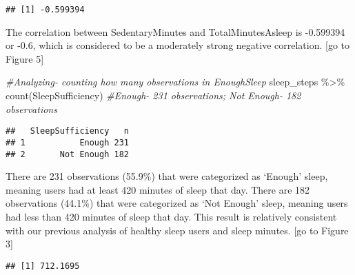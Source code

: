 \documentclass[
]{article}
\newenvironment{Shaded}{\begin{snugshade}}{\end{snugshade}}
\newcommand{\CommentTok}[1]{\textcolor[rgb]{0.56,0.35,0.01}{\textit{#1}}}
\newcommand{\FunctionTok}[1]{\textcolor[rgb]{0.00,0.00,0.00}{#1}}
\newcommand{\NormalTok}[1]{#1}
\newcommand{\SpecialCharTok}[1]{\textcolor[rgb]{0.00,0.00,0.00}{#1}}
\begin{document}
\begin{Shaded}
\end{Shaded}

\begin{verbatim}
## [1] -0.599394
\end{verbatim}

The correlation between SedentaryMinutes and TotalMinutesAsleep is
-0.599394 or -0.6, which is considered to be a moderately strong
negative correlation. {[}go to Figure 5{]}

\begin{Shaded}
\begin{Highlighting}[]
\CommentTok{\#Analyzing{-} counting how many observations in EnoughSleep}
\NormalTok{sleep\_steps }\SpecialCharTok{\%\textgreater{}\%} \FunctionTok{count}\NormalTok{(SleepSufficiency) }\CommentTok{\#Enough{-} 231 observations; Not Enough{-} 182 observations}
\end{Highlighting}
\end{Shaded}

\begin{verbatim}
##   SleepSufficiency   n
## 1           Enough 231
## 2       Not Enough 182
\end{verbatim}

There are 231 observations (55.9\%) that were categorized as `Enough'
sleep, meaning users had at least 420 minutes of sleep that day. There
are 182 observations (44.1\%) that were categorized as `Not Enough'
sleep, meaning users had less than 420 minutes of sleep that day. This
result is relatively consistent with our previous analysis of healthy
sleep users and sleep minutes. {[}go to Figure 3{]}

\begin{Shaded}
\end{Shaded}

\begin{verbatim}
## [1] 712.1695
\end{verbatim}
\end{document}
